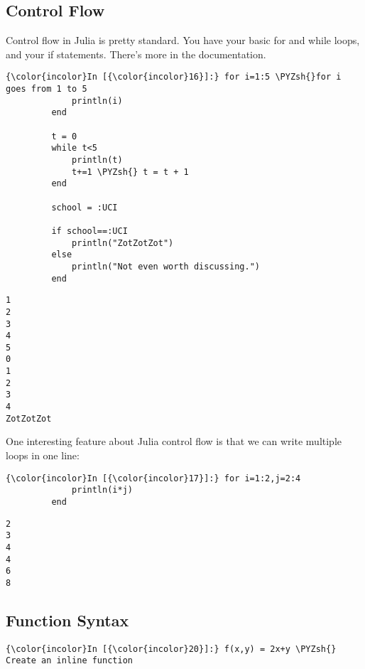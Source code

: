 \documentclass[11pt]{article}
\def\PYZsh{\char`\#}
\begin{document}
    \subsection{Control Flow}\label{control-flow}

Control flow in Julia is pretty standard. You have your basic for and
while loops, and your if statements. There's more in the documentation.

    \begin{Verbatim}[commandchars=\\\{\}]
{\color{incolor}In [{\color{incolor}16}]:} for i=1:5 \PYZsh{}for i goes from 1 to 5
             println(i)
         end
         
         t = 0
         while t<5
             println(t)
             t+=1 \PYZsh{} t = t + 1
         end
         
         school = :UCI
         
         if school==:UCI
             println("ZotZotZot")
         else
             println("Not even worth discussing.")
         end
\end{Verbatim}

    \begin{Verbatim}[commandchars=\\\{\}]
1
2
3
4
5
0
1
2
3
4
ZotZotZot

    \end{Verbatim}

    One interesting feature about Julia control flow is that we can write
multiple loops in one line:

    \begin{Verbatim}[commandchars=\\\{\}]
{\color{incolor}In [{\color{incolor}17}]:} for i=1:2,j=2:4
             println(i*j)
         end
\end{Verbatim}

    \begin{Verbatim}[commandchars=\\\{\}]
2
3
4
4
6
8

    \end{Verbatim}

    \subsection{Function Syntax}\label{function-syntax}

    \begin{Verbatim}[commandchars=\\\{\}]
{\color{incolor}In [{\color{incolor}20}]:} f(x,y) = 2x+y \PYZsh{} Create an inline function
\end{Verbatim}
\end{document}
